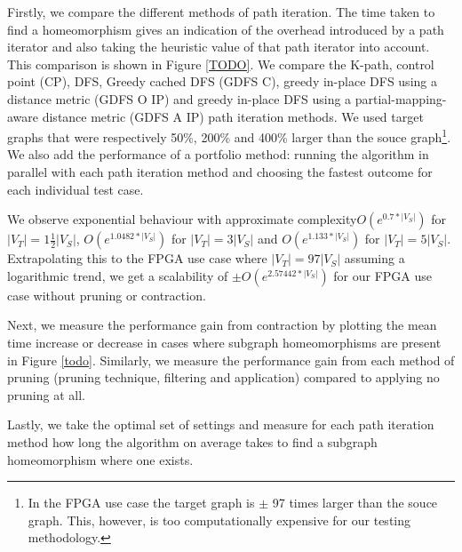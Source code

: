 Firstly, we compare the different methods of path iteration. The time taken to find a homeomorphism gives an indication of the overhead introduced by a path iterator and also taking the heuristic value of that path iterator into account. This comparison is shown in Figure \ref{TODO}. We compare the K-path, control point (CP), DFS, Greedy cached DFS (GDFS C), greedy in-place DFS using a distance metric (GDFS O IP) and greedy in-place DFS using a partial-mapping-aware distance metric (GDFS A IP) path iteration methods. We used target graphs that were respectively 50\%, 200\% and 400\% larger than the souce graph\footnote{In the FPGA use case the target graph is $\pm$ 97 times larger than the souce graph. This, however, is too computationally expensive for our testing methodology.}. We also add the performance of a portfolio method: running the algorithm in parallel with each path iteration method and choosing the fastest outcome for each individual test case.

We observe exponential behaviour with approximate complexity$O(e^{0.7*|V_S|})$ for $|V_T|=1\frac{1}{2}|V_S|$, $O(e^{1.0482*|V_S|})$ for $|V_T|=3|V_S|$ and $O(e^{1.133*|V_S|})$ for $|V_T|=5|V_S|$. Extrapolating this to the FPGA use case where $|V_T|=97|V_S|$ assuming a logarithmic trend, we get a scalability of $\pm O(e^{2.57442*|V_S|})$ for our FPGA use case without pruning or contraction.

Next, we measure the performance gain from contraction by plotting the mean time increase or decrease in cases where subgraph homeomorphisms are present in Figure \ref{todo}. Similarly, we measure the performance gain from each method of pruning (pruning technique, filtering and application) compared to applying no pruning at all.

Lastly, we take the optimal set of settings and measure for each path iteration method how long the algorithm on average takes to find a subgraph homeomorphism where one exists.




